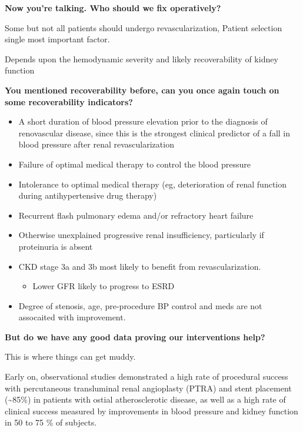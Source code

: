 \documentclass[
]{book}
\providecommand{\tightlist}{%
  \setlength{\itemsep}{0pt}\setlength{\parskip}{0pt}}
\begin{document}
\textbf{Now you're talking. Who should we fix operatively?}

Some but not all patients should undergo revascularization, Patient
selection single most important factor.

Depends upon the hemodynamic severity and likely recoverability of
kidney function

\textbf{You mentioned recoverability before, can you once again touch on some
recoverability indicators?}

\begin{itemize}
\item
  A short duration of blood pressure elevation prior to the diagnosis
  of renovascular disease, since this is the strongest clinical
  predictor of a fall in blood pressure after renal revascularization
\item
  Failure of optimal medical therapy to control the blood pressure
\item
  Intolerance to optimal medical therapy (eg, deterioration of renal
  function during antihypertensive drug therapy)
\item
  Recurrent flash pulmonary edema and/or refractory heart failure
\item
  Otherwise unexplained progressive renal insufficiency, particularly
  if proteinuria is absent
\item
  CKD stage 3a and 3b most likely to benefit from revascularization.
  \citep{singerImpactBaselineRenal2009}

  \begin{itemize}
  \tightlist
  \item
    Lower GFR likely to progress to ESRD
  \end{itemize}
\item
  Degree of stenosis, age, pre-procedure BP control and meds are not
  assocaited with improvement.
  \citep{textorPercutaneousRevascularizationIschemic2013}
\end{itemize}

\textbf{But do we have any good data proving our interventions help?}

This is where things can get muddy.

Early on, observational studies demonstrated a high rate of procedural
success with percutaneous transluminal renal angioplasty (PTRA) and
stent placement (\textasciitilde85\%) in patients with ostial atherosclerotic disease,
as well as a high rate of clinical success measured by improvements in
blood pressure and kidney function in 50 to 75 \% of subjects.
\end{document}
